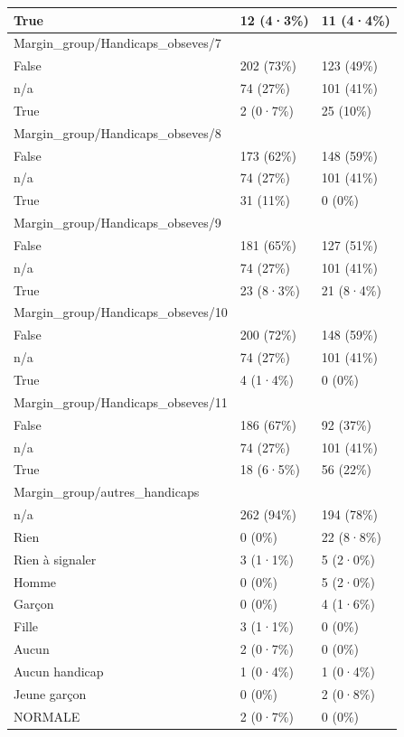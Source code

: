 \documentclass[
]{book}
\begin{document}
\begin{tabular}{l|l|l}
\hline
True & 12 (4·3\%) & 11 (4·4\%)\\
\hline
Margin\_group/Handicaps\_obseves/7 &  & \\
\hline
False & 202 (73\%) & 123 (49\%)\\
\hline
n/a & 74 (27\%) & 101 (41\%)\\
\hline
True & 2 (0·7\%) & 25 (10\%)\\
\hline
Margin\_group/Handicaps\_obseves/8 &  & \\
\hline
False & 173 (62\%) & 148 (59\%)\\
\hline
n/a & 74 (27\%) & 101 (41\%)\\
\hline
True & 31 (11\%) & 0 (0\%)\\
\hline
Margin\_group/Handicaps\_obseves/9 &  & \\
\hline
False & 181 (65\%) & 127 (51\%)\\
\hline
n/a & 74 (27\%) & 101 (41\%)\\
\hline
True & 23 (8·3\%) & 21 (8·4\%)\\
\hline
Margin\_group/Handicaps\_obseves/10 &  & \\
\hline
False & 200 (72\%) & 148 (59\%)\\
\hline
n/a & 74 (27\%) & 101 (41\%)\\
\hline
True & 4 (1·4\%) & 0 (0\%)\\
\hline
Margin\_group/Handicaps\_obseves/11 &  & \\
\hline
False & 186 (67\%) & 92 (37\%)\\
\hline
n/a & 74 (27\%) & 101 (41\%)\\
\hline
True & 18 (6·5\%) & 56 (22\%)\\
\hline
Margin\_group/autres\_handicaps &  & \\
\hline
n/a & 262 (94\%) & 194 (78\%)\\
\hline
Rien & 0 (0\%) & 22 (8·8\%)\\
\hline
Rien à signaler & 3 (1·1\%) & 5 (2·0\%)\\
\hline
Homme & 0 (0\%) & 5 (2·0\%)\\
\hline
Garçon & 0 (0\%) & 4 (1·6\%)\\
\hline
Fille & 3 (1·1\%) & 0 (0\%)\\
\hline
Aucun & 2 (0·7\%) & 0 (0\%)\\
\hline
Aucun handicap & 1 (0·4\%) & 1 (0·4\%)\\
\hline
Jeune garçon & 0 (0\%) & 2 (0·8\%)\\
\hline
NORMALE & 2 (0·7\%) & 0 (0\%)\\

\end{tabular}
\end{document}
